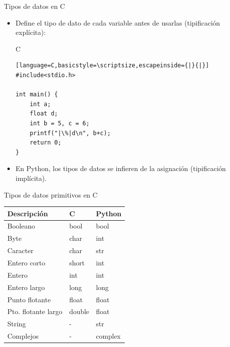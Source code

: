 \documentclass{beamer}
\begin{document}
\begin{frame}[fragile]{Tipos de datos en C}
\begin{itemize}
	\item Define el tipo de dato de cada variable antes de usarlas (tipificación explícita):
	\begin{exampleblock}{C}
		\begin{lstlisting}[language=C,basicstyle=\scriptsize,escapeinside={|}{|}]
#include<stdio.h>

int main() {
	int a;
	float d;
	int b = 5, c = 6;
	printf("|\%|d\n", b+c);
	return 0;
}
		\end{lstlisting}
	\end{exampleblock}
	\item En Python, los tipos de datos se infieren de la asignación (tipificación implícita).
\end{itemize}
\end{frame}

\begin{frame}[fragile]{Tipos de datos primitivos en C}
\vspace{-.25cm}
\begin{center}
	\begin{tabular}{|l|l|l|}\hline \hline
		\textbf{Descripción} & \textbf{C} & \textbf{Python}   \\ \hline \hline
		Booleano       &  bool &  bool \\
		Byte           &  char  & int \\
		Caracter       &  char  & str \\
		Entero corto   &  short & int \\
		Entero         &  int  & int \\
		Entero largo   & long  & long \\
		Punto flotante & float & float   \\
		Pto. flotante largo & double & float   \\
		String              & - & str \\ 
		Complejos  & - & complex \\ \hline
	\end{tabular}
\end{center}
\end{frame}
\end{document}
